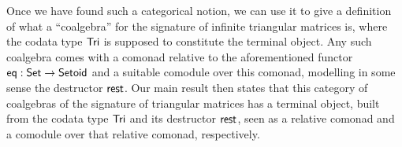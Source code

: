 \documentclass{llncs}
\newcommand{\fat}[1]{\textbf{#1}}
\begin{document}
  Once we have found such a categorical notion, we can use 
  it to give a definition of what a \enquote{coalgebra} for the signature of infinite triangular matrices is, 
  where the codata type $\mathsf{Tri}$ is supposed to constitute the terminal object.
  Any such coalgebra comes with a comonad relative to the aforementioned functor $\mathsf{eq} : \mathsf{Set}\to\mathsf{Setoid}$
  and a suitable comodule over this comonad, modelling in some sense the destructor $\mathsf{rest}$.
  Our main result then states that this category of coalgebras of the signature of triangular matrices 
  has a terminal object, built from the codata type $\mathsf{Tri}$ and its destructor $\mathsf{rest}$,
  seen as a relative comonad and a comodule over that relative comonad, respectively.
% 
% 
% 
% 
% 
% 
% 
% 
\end{document}
